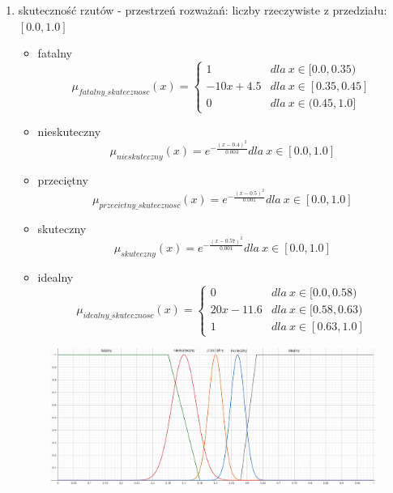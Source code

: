 \documentclass{classrep}
\begin{document}
\begin{enumerate}
    \item skuteczność rzutów - przestrzeń rozważań: liczby rzeczywiste z przedziału: $[0.0, 1.0]$
     \begin{itemize}
        \item fatalny
        \begin{equation}
            \mu_{fatalny\_skutecznosc}(x) = \left\{\begin{matrix} 1 & dla \: x\in[0.0, 0.35) \\ -10x + 4.5 & dla \: x\in [0.35, 0.45] \\ 0 & dla \: x\in (0.45, 1.0] \end{matrix}\right.
        \end{equation}
        \item nieskuteczny
        \begin{equation}
            \mu_{nieskuteczny}(x) = e^{-\frac{(x-0.4)^2}{0.003}} dla \: x \in [0.0, 1.0]
        \end{equation}
        \item przeciętny
        \begin{equation}
            \mu_{przecietny\_skutecznosc}(x) = e^{-\frac{(x-0.5)^2}{0.001}} dla \: x \in [0.0, 1.0]
        \end{equation}
        \item skuteczny
        \begin{equation}
            \mu_{skuteczny}(x) = e^{-\frac{(x-0.57)^2}{0.001}} dla \: x \in [0.0, 1.0]
        \end{equation}
        \item idealny
        \begin{equation}
            \mu_{idealny\_skutecznosc}(x) = \left\{\begin{matrix} 0 & dla \: x\in [0.0, 0.58) \\ 20x - 11.6 & dla \: x\in[0.58, 0.63) \\ 1 & dla \: x\in [0.63, 1.0] \end{matrix}\right.
        \end{equation}
    \end{itemize}
    \begin{figure}[H]
        \centering
        \includegraphics[width=14cm]{wykres_skutecznosc.png}

\end{figure}
\end{enumerate}
\end{document}
